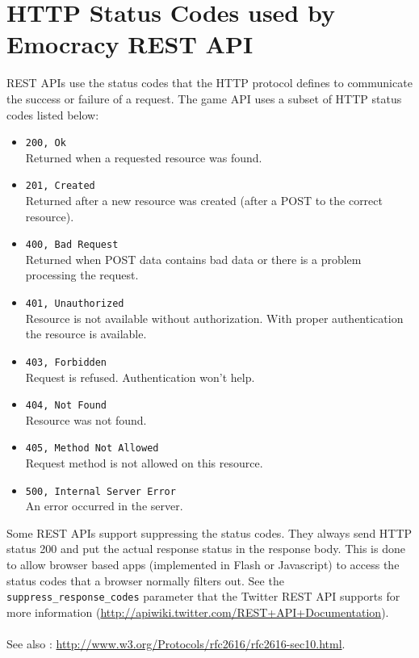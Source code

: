 \documentclass[a4paper]{report}
\begin{document}
\section{HTTP Status Codes used by Emocracy REST API}\label{httpstatuscodes}
REST APIs use the status codes that the HTTP protocol defines to communicate the
success or failure of a request. The game API uses a subset of HTTP status
codes listed below:
\begin{itemize}
    \item{\texttt{200, Ok}\\
    Returned when a requested resource was found.
    }
    \item{\texttt{201, Created}\\
    Returned after a new resource was created (after a POST to the correct 
    resource).
    }
    \item{\texttt{400, Bad Request}\\
    Returned when POST data contains bad data or there is a problem processing 
    the request.
    }
    \item{\texttt{401, Unauthorized}\\
    Resource is not available without authorization. With proper authentication
    the resource is available.
    }
    \item{\texttt{403, Forbidden}\\
    Request is refused. Authentication won't help.
    }
    \item{\texttt{404, Not Found}\\
    Resource was not found.
    }
    \item{\texttt{405, Method Not Allowed}\\
    Request method is not allowed on this resource.
    }
    \item{\texttt{500, Internal Server Error}\\
    An error occurred in the server.
    }
\end{itemize}

Some REST APIs support suppressing the status codes. They always send HTTP 
status 200 and put the actual response status in the response body. This is 
done to allow browser based apps (implemented in Flash or Javascript) to access
the status codes that a browser normally filters out. See the 
\texttt{suppress\_response\_codes} parameter that the Twitter REST API supports
for more information (\mbox{\url{http://apiwiki.twitter.com/REST+API+Documentation}}).\\\\
See also : \mbox{\url{http://www.w3.org/Protocols/rfc2616/rfc2616-sec10.html}.}
\end{document}
